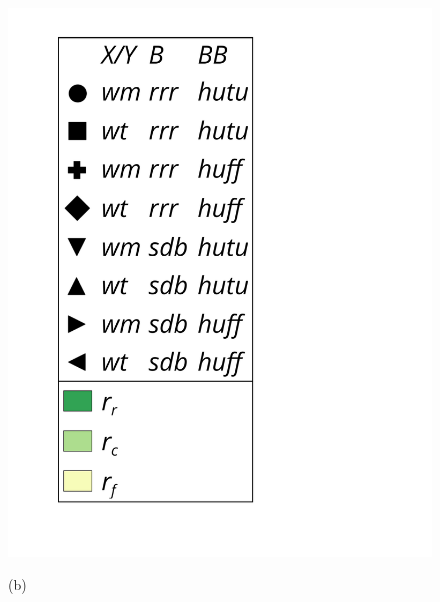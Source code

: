 \begin{figure}
\begin{minipage}{1\textwidth}
\begin{minipage}{0.45\textwidth}
\begin{minipage}{0.15\textwidth}
    				\includegraphics[scale=.16, clip, trim=70 0 0 0]{img/sdsl/label.pdf}
    			\end{minipage}
    			
    			(b)
    		\end{minipage}  		
    	\end{minipage}
    	

\end{figure}

